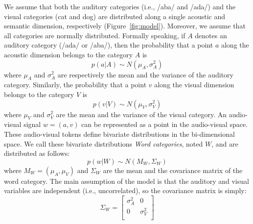 \documentclass[english,,man,floatsintext]{apa6}
\theoremstyle{definition}
\theoremstyle{definition}
\theoremstyle{definition}
\theoremstyle{remark}
\begin{document}
We assume that both the auditory categories (i.e., /aba/ and /ada/) and
the visual categories (cat and dog) are distributed along a single
acoustic and semantic dimension, respectively (Figure~\ref{fig:model}).
Moreover, we assume that all categories are normally distributed.
Formally speaking, if \(A\) denotes an auditory category (/ada/ or
/aba/), then the probability that a point \(a\) along the acoustic
dimension belongs to the category \(A\) is
\[ p(a | A) \sim  N(\mu_A, \sigma^2_A) \] where \(\mu_A\) and
\(\sigma^2_A\) are respectively the mean and the variance of the
auditory category. Similarly, the probability that a point \(v\) along
the visual dimension belongs to the category \(V\) is
\[ p(v | V) \sim  N(\mu_V, \sigma^2_V) \] where \(\mu_V\) and
\(\sigma^2_V\) are the mean and the variance of the visual category. An
audio-visual signal \(w=(a,v)\) can be represented as a point in the
audio-visual space. These audio-visual tokens define bivariate
distributions in the bi-dimensional space. We call these bivariate
distributions \emph{Word categories}, noted \(W\), and are distributed
as follows: \[ p(w | W) \sim  N(M_W, \Sigma_W) \] where
\(M_W=(\mu_A, \mu_V)\) and \(\Sigma_W\) are the mean and the covariance
matrix of the word category. The main assumption of the model is that
the auditory and visual variables are independent (i.e., uncorrelated),
so the covariance matrix is simply: \[
   \Sigma_W=
  \left[ {\begin{array}{cc}
   \sigma^2_A & 0 \\
   0 & \sigma^2_V \\
  \end{array} } \right]
\]
\end{document}

